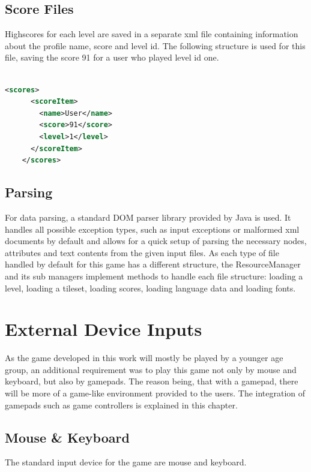 \subsection{Score Files}\label{subsec:score-files}
Highscores for each level are saved in a separate xml file containing information about the profile name, score and level id.
The following structure is used for this file, saving the score 91 for a user who played level id one.
\\ \\
\begin{lstlisting}[language=XML,label={lst:score-xml}]
    <scores>
      <scoreItem>
        <name>User</name>
        <score>91</score>
        <level>1</level>
      </scoreItem>
    </scores>
\end{lstlisting}

\subsection{Parsing}\label{subsec:parsing}
For data parsing, a standard DOM parser library provided by Java is used.
It handles all possible exception types, such as input exceptions or malformed xml documents by default and allows for a quick setup of parsing
the necessary nodes, attributes and text contents from the given input files.
As each type of file handled by default for this game has a different structure, the ResourceManager and its sub managers implement methods to handle
each file structure: loading a level, loading a tileset, loading scores, loading language data and loading fonts.

\section{External Device Inputs}\label{sec:external-device-inputs}
As the game developed in this work will mostly be played by a younger age group, an additional requirement was to play this game not only by mouse and keyboard,
but also by gamepads.
The reason being, that with a gamepad, there will be more of a game-like environment provided to the users.
The integration of gamepads such as game controllers is explained in this chapter.
\subsection{Mouse \& Keyboard}\label{subsec:mouse-&-keyboard}
The standard input device for the game are mouse and keyboard.
